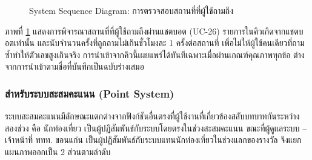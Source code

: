 \begin{figure}[H]
\centering
{}
\caption{System Sequence Diagram: การตรวจสอบสถานที่ที่ผู้ใช้ถามถึง}
\label{fig:ssd_admin_candidates}
\end{figure}

ภาพที่ \ref{fig:ssd_admin_candidates} แสดงการพิจารณาสถานที่ที่ผู้ใช้ถามถึงผ่านแชตบอต (UC-26) รายการในคิวเกิดจากแชตบอตเท่านั้น และนับจำนวนครั้งที่ถูกถามไม่เกินชั่วโมงละ 1 ครั้งต่อสถานที่ เพื่อไม่ให้ผู้ใช้คนเดียวที่ถามซ้ำทำให้ตัวเลขสูงเกินจริง การนำเข้าจากคิวนี้เผยแพร่ได้ทันทีเฉพาะเมื่อผ่านเกณฑ์คุณภาพทุกข้อ ต่างจากการนำเข้าตามชื่อที่บันทึกเป็นฉบับร่างเสมอ

\subsubsection{สำหรับระบบสะสมคะแนน (Point System)}

ระบบสะสมคะแนนมีลักษณะแตกต่างจากฟังก์ชันอื่นตรงที่ผู้ใช้งานที่เกี่ยวข้องสลับบทบาทกันระหว่างสองช่วง คือ นักท่องเที่ยว เป็นผู้ปฏิสัมพันธ์กับระบบโดยตรงในช่วงสะสมคะแนน ขณะที่ผู้ดูแลระบบ -- เจ้าหน้าที่ ททท. ขอนแก่น เป็นผู้ปฏิสัมพันธ์กับระบบแทนนักท่องเที่ยวในช่วงแลกของรางวัล จึงแยกแผนภาพออกเป็น 2 ส่วนตามลำดับ

